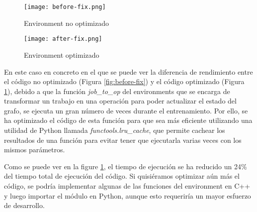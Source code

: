 \begin{figure}
    \centering
    \begin{minipage}{0.47\textwidth}
        \centering
        \texttt{[image: before-fix.png]} 
        \caption{Environment no optimizado}
        \label{fig:before-fix}
    \end{minipage}\hfill
    \begin{minipage}{0.47\textwidth}
        \centering
        \texttt{[image: after-fix.png]}
        \caption{Environment optimizado}
        \label{fig:after-fix}
    \end{minipage}
\end{figure}

En este caso en concreto en el que se puede ver la diferencia de rendimiento
entre el código no optimizado (Figura \ref{fig:before-fix}) y el código 
optimizado (Figura \ref{fig:after-fix}), debido a que la función
\textit{job\_to\_op} del environments que se encarga de transformar un trabajo
en una operación para poder actualizar el estado del grafo, se ejecuta un gran
número de veces durante el entrenamiento. Por ello, se ha optimizado el código
de esta función para que sea más eficiente utilizando una utilidad de Python
llamada \textit{functools.lru\_cache}, que permite cachear los resultados de
una función para evitar tener que ejecutarla varias veces con los mismos
parámetros.\medskip

Como se puede ver en la figure \ref{fig:after-fix}, el tiempo de ejecución
se ha reducido un 24\% del tiempo total de ejecución del código. Si quisiéramos
optimizar aún más el código, se podría implementar algunas de las funciones
del environment en C++ y luego importar el módulo en Python, aunque esto
requeriría un mayor esfuerzo de desarrollo. 